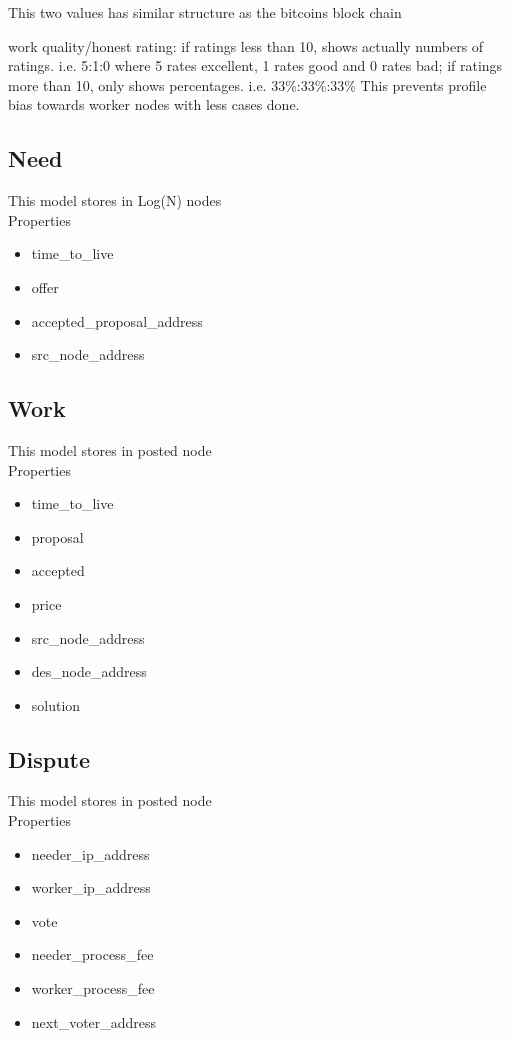 \documentclass[12pt]{article}
\begin{document}
This two values has similar structure as the bitcoins block chain

work quality/honest rating:
if ratings less than 10, shows actually numbers of ratings. i.e. 5:1:0 where 5 rates excellent, 1 rates good and 0 rates bad;
if ratings more than 10, only shows percentages. i.e. 33\%:33\%:33\% This prevents profile bias towards worker nodes with less cases done.

\subsection{Need}
This model stores in Log(N) nodes\\
Properties
\begin{itemize}
	\item time\_to\_live
	\item offer
	\item accepted\_proposal\_address
	\item src\_node\_address
\end{itemize}

\subsection{Work}
This model stores in posted node\\
Properties
\begin{itemize}
	\item time\_to\_live
	\item proposal
	\item accepted
	\item price
	\item src\_node\_address
	\item des\_node\_address
	\item solution
\end{itemize}

\subsection{Dispute}
This model stores in posted node\\
Properties
\begin{itemize}
	\item needer\_ip\_address
	\item worker\_ip\_address
	\item vote
	\item needer\_process\_fee
	\item worker\_process\_fee
	\item next\_voter\_address
\end{itemize}
\end{document}
